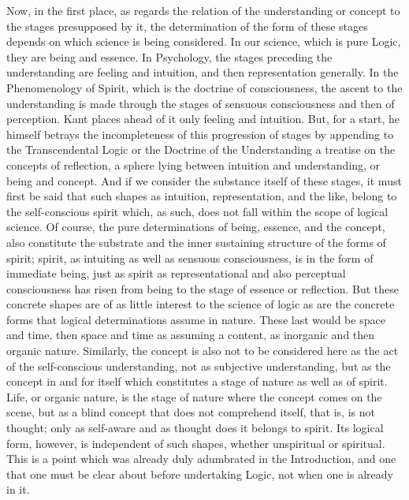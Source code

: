 Now, in the first place, as regards the relation
of the understanding or concept to the stages presupposed by it,
the determination of the form of these stages
depends on which science is being considered.
In our science, which is pure Logic,
they are being and essence.
In Psychology, the stages preceding the understanding are
feeling and intuition, and then representation generally.
In the Phenomenology of Spirit,
which is the doctrine of consciousness,
the ascent to the understanding is
made through the stages of sensuous consciousness
and then of perception.
Kant places ahead of it only feeling and intuition.
But, for a start, he himself betrays the incompleteness of
this progression of stages by appending
to the Transcendental Logic
or the Doctrine of the Understanding
a treatise on the concepts of reflection,
a sphere lying between intuition and understanding,
or being and concept.
And if we consider the substance itself of these stages,
it must first be said that such shapes as
intuition, representation, and the like,
belong to the self-conscious spirit
which, as such, does not fall within
the scope of logical science.
Of course, the pure determinations of
being, essence, and the concept,
also constitute the substrate
and the inner sustaining structure
of the forms of spirit;
spirit, as intuiting as well as sensuous consciousness,
is in the form of immediate being,
just as spirit as representational
and also perceptual consciousness
has risen from being to the stage of essence or reflection.
But these concrete shapes are of as little interest
to the science of logic as are the concrete forms
that logical determinations assume in nature.
These last would be space and time,
then space and time as assuming a content,
as inorganic and then organic nature.
Similarly, the concept is also
not to be considered here as
the act of the self-conscious understanding,
not as subjective understanding,
but as the concept in and for itself
which constitutes a stage of nature
as well as of spirit.
Life, or organic nature, is the stage of nature
where the concept comes on the scene,
but as a blind concept that does not comprehend itself,
that is, is not thought;
only as self-aware and as thought does it belongs to spirit.
Its logical form, however, is independent of such shapes,
whether unspiritual or spiritual.
This is a point which was already
duly adumbrated in the Introduction,
and one that one must be clear about
before undertaking Logic,
not when one is already in it.


